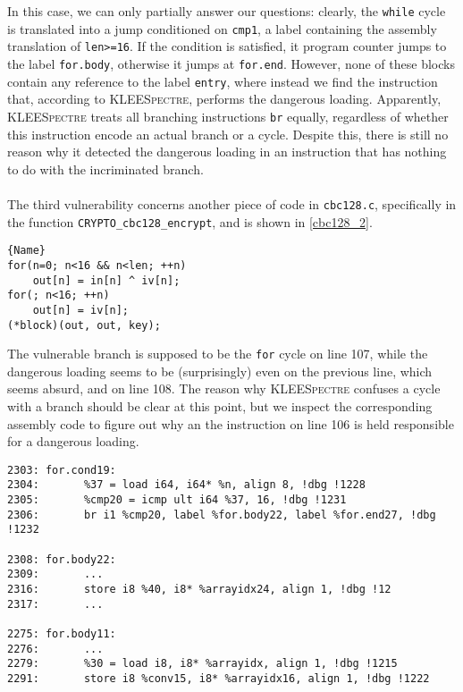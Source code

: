 \documentclass[12pt,a4paper]{book}
\theoremstyle{definition}
\begin{document}
	In this case, we can only partially answer our questions: clearly, the \texttt{while} cycle is translated into a jump conditioned on \texttt{cmp1}, a label containing the assembly translation of \texttt{len>=16}. If the condition is satisfied, it program counter jumps to the label \texttt{for.body}, otherwise it jumps at \texttt{for.end}. However, none of these blocks contain any reference to the label \texttt{entry}, where instead we find the instruction that, according to \textsc{KLEESpectre}, performs the dangerous loading. Apparently, \textsc{KLEESpectre} treats all branching instructions \texttt{br} equally, regardless of whether this instruction encode an actual branch or a cycle. Despite this, there is still no reason why it detected the dangerous loading in an instruction that has nothing to do with the incriminated branch. 
	\paragraph{}The third vulnerability concerns another piece of code in \texttt{cbc128.c}, specifically in the function \texttt{CRYPTO\_cbc128\_encrypt}, and is shown in \ref{cbc128_2}.
	
	\begin{minipage}{.45\textwidth}
		\begin{lstlisting}[caption=\texttt{cbc128.c}, firstnumber=105, label=cbc128_2]{Name}
for(n=0; n<16 && n<len; ++n)
	out[n] = in[n] ^ iv[n];
for(; n<16; ++n)
	out[n] = iv[n];
(*block)(out, out, key);
		\end{lstlisting}
	\end{minipage}
	\vspace{3mm}
	
	The vulnerable branch is supposed to be the \texttt{for} cycle on line 107, while the dangerous loading seems to be (surprisingly) even on the previous line, which seems absurd, and on line 108. The reason why \textsc{KLEESpectre} confuses a cycle with a branch should be clear at this point, but we inspect the corresponding assembly code to figure out why an the instruction on line 106 is held responsible for a dangerous loading.
	
	\lstset{
		numbers=none
	}
	\begin{lstlisting}[caption=\texttt{assembly.ll}]
2303: for.cond19:                
2304: 		%37 = load i64, i64* %n, align 8, !dbg !1228
2305:		%cmp20 = icmp ult i64 %37, 16, !dbg !1231                       
2306: 		br i1 %cmp20, label %for.body22, label %for.end27, !dbg !1232

2308: for.body22: 
2309:		...
2316:		store i8 %40, i8* %arrayidx24, align 1, !dbg !12
2317:		...

2275: for.body11: 
2276:		...
2279: 		%30 = load i8, i8* %arrayidx, align 1, !dbg !1215
2291: 		store i8 %conv15, i8* %arrayidx16, align 1, !dbg !1222
	\end{lstlisting}
	\vspace{3mm}
	
\end{document}
